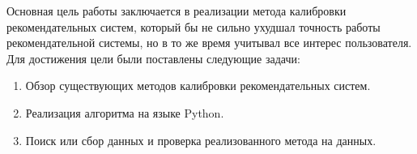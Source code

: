 

Основная цель работы заключается в реализации метода калибровки рекомендательных систем, который бы не сильно ухудшал точность работы рекомендательной системы, но в то же время учитывал все интерес пользователя.
\\

Для достижения цели были поставлены следующие задачи:
\begin{enumerate} 
    \item Обзор существующих методов калибровки рекомендательных систем.
    \item Реализация алгоритма на языке Python.
    \item Поиск или сбор данных и проверка реализованного метода на данных.
  \end{enumerate}
  